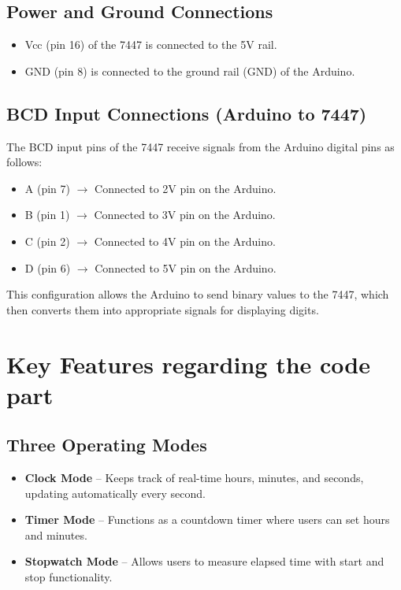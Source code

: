 \documentclass[journal]{IEEEtran}
\begin{document}
\subsection{Power and Ground Connections}

\begin{itemize}
    \item Vcc (pin 16) of the 7447 is connected to the 5V rail.
    \item GND (pin 8) is connected to the ground rail (GND) of the Arduino.
\end{itemize}

\subsection{BCD Input Connections (Arduino to 7447)}

The BCD input pins of the 7447 receive signals from the Arduino digital pins as follows:

\begin{itemize}
    \item A (pin 7) $\rightarrow$ Connected to 2V pin on the Arduino.
    \item B (pin 1) $\rightarrow$ Connected to 3V pin on the Arduino.
    \item C (pin 2) $\rightarrow$ Connected to 4V pin on the Arduino.
    \item D (pin 6) $\rightarrow$ Connected to 5V pin on the Arduino.
\end{itemize}

This configuration allows the Arduino to send binary values to the 7447, which then converts them into appropriate signals for displaying digits.


\section{Key Features regarding the code part}  
\vspace{0.2cm}  

\subsection{Three Operating Modes}  
\vspace{0.3cm}  
\begin{itemize}  
    \item \textbf{Clock Mode} – Keeps track of real-time hours, minutes, and seconds, updating automatically every second.  
    \item \textbf{Timer Mode} – Functions as a countdown timer where users can set hours and minutes.  
    \item \textbf{Stopwatch Mode} – Allows users to measure elapsed time with start and stop functionality.  
\end{itemize}  
\vspace{0.2cm}  
\end{document}
